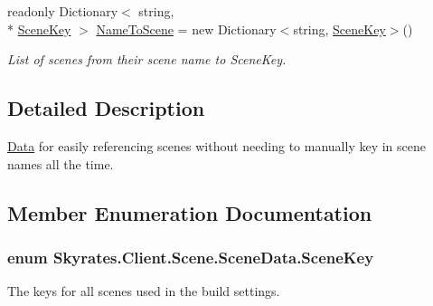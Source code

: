 \begin{DoxyCompactItemize}
readonly Dictionary$<$ string, \\*
\hyperlink{class_skyrates_1_1_client_1_1_scene_1_1_scene_data_a31ee71a248fd3456a7e655f71f268583}{Scene\-Key} $>$ \hyperlink{class_skyrates_1_1_client_1_1_scene_1_1_scene_data_a711010b1f45c341f1617742c94263ceb}{Name\-To\-Scene} = new Dictionary$<$string, \hyperlink{class_skyrates_1_1_client_1_1_scene_1_1_scene_data_a31ee71a248fd3456a7e655f71f268583}{Scene\-Key}$>$()
\begin{DoxyCompactList}\small\item\em List of scenes from their scene name to Scene\-Key. \end{DoxyCompactList}\end{DoxyCompactItemize}


\subsection{Detailed Description}
\hyperlink{namespace_skyrates_1_1_client_1_1_data}{Data} for easily referencing scenes without needing to manually key in scene names all the time. 



\subsection{Member Enumeration Documentation}
\hypertarget{class_skyrates_1_1_client_1_1_scene_1_1_scene_data_a31ee71a248fd3456a7e655f71f268583}{
\subsubsection[{Scene\-Key}]{\setlength{\rightskip}{0pt plus 5cm}enum {\bf Skyrates.\-Client.\-Scene.\-Scene\-Data.\-Scene\-Key}}}\label{class_skyrates_1_1_client_1_1_scene_1_1_scene_data_a31ee71a248fd3456a7e655f71f268583}


The keys for all scenes used in the build settings. 




